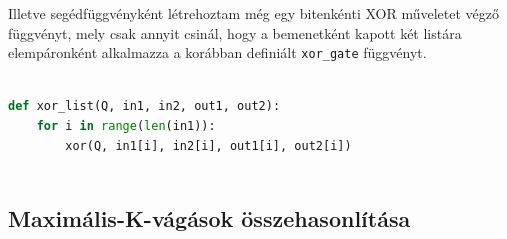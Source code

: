 Illetve segédfüggvényként létrehoztam még egy bitenkénti XOR műveletet végző függvényt, mely csak annyit csinál, hogy a bemenetként kapott két listára elempáronként alkalmazza a korábban definiált \verb+xor_gate+ függvényt.

\begin{lstlisting}[language=python,caption=Elemi kapuk,label=code:XorGateList]
	
def xor_list(Q, in1, in2, out1, out2):
	for i in range(len(in1)):
		xor(Q, in1[i], in2[i], out1[i], out2[i])
	
\end{lstlisting}

\subsection{Maximális-K-vágások összehasonlítása}

